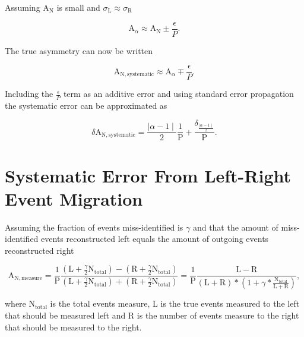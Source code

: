 \noindent
Assuming A$_{\mathrm{N}}$ is small and $\sigma_{\mathrm{L}} \approx
\sigma_{\mathrm{R}}$

\begin{equation}
\mathrm{A}_{\alpha}\approx 
\mathrm{A}_{\mathrm{N}} \pm \frac{\epsilon}{P}.
\end{equation}

\noindent
The true asymmetry can now be written

\begin{equation}
  \mathrm{A}_{\mathrm{N,systematic}} \approx
  \mathrm{A}_{\alpha} \mp \frac{\epsilon}{P}.
\end{equation}

\noindent
Including the $\frac{\epsilon}{P}$ term as an additive error and using standard
error propagation the systematic error can be approximated as

\begin{equation}
  \delta \mathrm{A}_{\mathrm{N,systematic}} = \frac{ \mid\alpha - 1
    \mid}{2}\frac{1}{\mathrm{P}} + \frac{\delta_{\frac{\mid \alpha -1
        \mid}{2}}}{\mathrm{P}}.
\end{equation}


\section{Systematic Error From Left-Right Event Migration}
\label{app::sysLRmiss}

Assuming the fraction of events miss-identified is $\gamma$ and that the amount
of miss-identified events reconstructed left equals the amount of outgoing
events reconstructed right

\begin{equation}
  \mathrm{A}_{\mathrm{N,measure}} =
  \frac{1}{\mathrm{P}} \frac{(\mathrm{L}+ \frac{\gamma}{2}
    \mathrm{N}_{\mathrm{total}}) - (\mathrm{R} + \frac{\gamma}{2}
    \mathrm{N}_{\mathrm{total}})} {(\mathrm{L}+ \frac{\gamma}{2}
    \mathrm{N}_{\mathrm{total}})+(\mathrm{R}+ \frac{\gamma}{2}
    \mathrm{N}_{\mathrm{total}})}
  = \frac{1}{\mathrm{P}} \frac{\mathrm{L} - \mathrm{R}}
         {(\mathrm{L}+\mathrm{R})*(1+ \gamma
           *\frac{\mathrm{N}_{\mathrm{total}}}{\mathrm{L}+\mathrm{R}})},
\end{equation}

\noindent
where N$_{\mathrm{total}}$ is the total events measure, L is the true events
measured to the left that should be measured left and R is the number of events
measure to the right that should be measured to the right.\par

